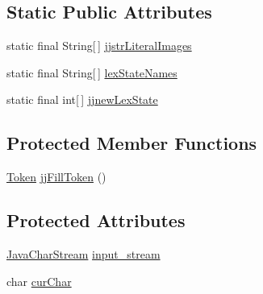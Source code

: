 \subsection*{Static Public Attributes}
\begin{DoxyCompactItemize}
\item 
static final String\mbox{[}$\,$\mbox{]} \hyperlink{classuk_1_1ac_1_1manchester_1_1cs_1_1owl_1_1owlapi_1_1turtle_1_1parser_1_1_turtle_parser_token_manager_a941f3dd6940d4bd1bfc9aae65f4973b2}{jjstr\-Literal\-Images}
\item 
static final String\mbox{[}$\,$\mbox{]} \hyperlink{classuk_1_1ac_1_1manchester_1_1cs_1_1owl_1_1owlapi_1_1turtle_1_1parser_1_1_turtle_parser_token_manager_a93d71ec11e23d26ceda8dc5c93fed052}{lex\-State\-Names}
\item 
static final int\mbox{[}$\,$\mbox{]} \hyperlink{classuk_1_1ac_1_1manchester_1_1cs_1_1owl_1_1owlapi_1_1turtle_1_1parser_1_1_turtle_parser_token_manager_ae394328808376d08400e4c93d38edde4}{jjnew\-Lex\-State}
\end{DoxyCompactItemize}
\subsection*{Protected Member Functions}
\begin{DoxyCompactItemize}
\item 
\hyperlink{classuk_1_1ac_1_1manchester_1_1cs_1_1owl_1_1owlapi_1_1turtle_1_1parser_1_1_token}{Token} \hyperlink{classuk_1_1ac_1_1manchester_1_1cs_1_1owl_1_1owlapi_1_1turtle_1_1parser_1_1_turtle_parser_token_manager_ae1f45faab4e383890ab902babdb82fff}{jj\-Fill\-Token} ()
\end{DoxyCompactItemize}
\subsection*{Protected Attributes}
\begin{DoxyCompactItemize}
\item 
\hyperlink{classuk_1_1ac_1_1manchester_1_1cs_1_1owl_1_1owlapi_1_1turtle_1_1parser_1_1_java_char_stream}{Java\-Char\-Stream} \hyperlink{classuk_1_1ac_1_1manchester_1_1cs_1_1owl_1_1owlapi_1_1turtle_1_1parser_1_1_turtle_parser_token_manager_a13c92357235d06977c5aec69b3d6ed53}{input\-\_\-stream}
\item 
char \hyperlink{classuk_1_1ac_1_1manchester_1_1cs_1_1owl_1_1owlapi_1_1turtle_1_1parser_1_1_turtle_parser_token_manager_a8a90338bc212fa7a1a7917ef25431d25}{cur\-Char}
\end{DoxyCompactItemize}
